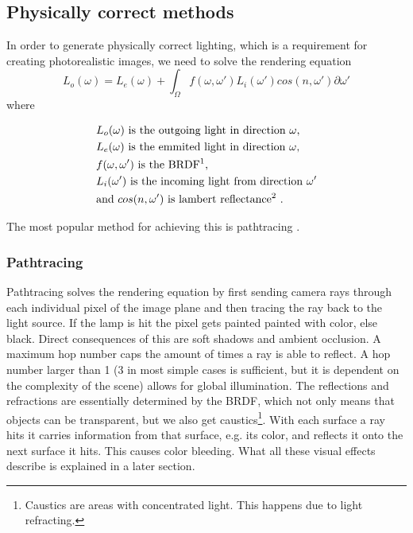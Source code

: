 \documentclass{ACGSeminar}
\begin{document}
	\subsection{Physically correct methods}
	In order to generate physically correct lighting, which is a requirement for creating photorealistic images, we need to solve the rendering equation
	$$ L_o(\omega) = L_e(\omega) + \int_\Omega f(\omega, \omega')L_i(\omega')cos(n, \omega') \partial \omega' $$
	where 
	\begin{center}
		\begin{align*}
			&L_o(\omega) \text{ is the outgoing light in direction } \omega\text{,}\\
			&L_e(\omega) \text{ is the emmited light in direction } \omega\text{,}\\
			&f(\omega, \omega') \text{ is the BRDF\footnotemark} \text{,}\\
			&L_i(\omega') \text{ is the incoming light from direction } \omega'\\
			&\text{and } cos(n, \omega') \text{ is lambert reflectance\footnotemark}  \text{ .}
		\end{align*}
	\end{center}
	\addtocounter{footnote}{-1}
	The most popular method for achieving this is pathtracing \cite{P2PATH}.
	\subsubsection{Pathtracing}
		Pathtracing solves the rendering equation by first sending camera rays through each individual pixel of the image plane and then tracing the ray back to the light source. If the lamp is hit the pixel gets painted painted with color, else black. Direct consequences of this are soft shadows and ambient occlusion. A maximum hop number caps the amount of times a ray is able to reflect. A hop number larger than 1 (3 in most simple cases is sufficient, but it is dependent on the complexity of the scene) allows for global illumination. The reflections and refractions are essentially determined by the BRDF, which not only means that objects can be transparent, but we also get caustics\footnote{Caustics are areas with concentrated light. This happens due to light refracting.}. With each surface a ray hits it carries information from that surface, e.g. its color, and reflects it onto the next surface it hits. This causes color bleeding. What all these visual effects describe is explained in a later section. %
\end{document}
